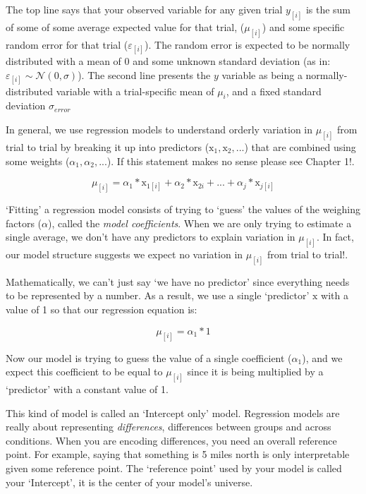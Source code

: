 \documentclass[
]{book}
\begin{document}
The top line says that your observed variable for any given trial \(y_{[i]}\) is the sum of some of some average expected value for that trial, (\(\mu_{[i]}\)) and some specific random error for that trial (\(\varepsilon_{[i]}\)). The random error is expected to be normally distributed with a mean of 0 and some unknown standard deviation (as in: \(\varepsilon_{[i]} \sim \mathcal{N}(0,\sigma)\)). The second line presents the \(y\) variable as being a normally-distributed variable with a trial-specific mean of \(\mu_i\), and a fixed standard deviation \(\sigma_{error}\)

In general, we use regression models to understand orderly variation in \(\mu_{[i]}\) from trial to trial by breaking it up into predictors (\(\mathrm{x}_{1}, \mathrm{x}_{2},...\)) that are combined using some weights (\(\alpha_1, \alpha_2,...\)). If this statement makes no sense please see Chapter 1!.

\[
\mu_{[i]} = \alpha_1*\mathrm{x}_{1{[i]}} + \alpha_2*\mathrm{x}_{2i}+...+\alpha_j*\mathrm{x}_{j{[i]}}
\label{eq:22}
\]

`Fitting' a regression model consists of trying to `guess' the values of the weighing factors (\(\alpha\)), called the \emph{model coefficients}. When we are only trying to estimate a single average, we don't have any predictors to explain variation in \(\mu_{[i]}\). In fact, our model structure suggests we expect no variation in \(\mu_{[i]}\) from trial to trial!.

Mathematically, we can't just say `we have no predictor' since everything needs to be represented by a number. As a result, we use a single `predictor' \(\mathrm{x}\) with a value of 1 so that our regression equation is:

\[
\mu_{[i]} = \alpha_1*1
\label{eq:23}
\]

Now our model is trying to guess the value of a single coefficient (\(\alpha_1\)), and we expect this coefficient to be equal to \(\mu_{[i]}\) since it is being multiplied by a `predictor' with a constant value of 1.

This kind of model is called an `Intercept only' model. Regression models are really about representing \emph{differences}, differences between groups and across conditions. When you are encoding differences, you need an overall reference point. For example, saying that something is 5 miles north is only interpretable given some reference point. The `reference point' used by your model is called your `Intercept', it is the center of your model's universe.
\end{document}
